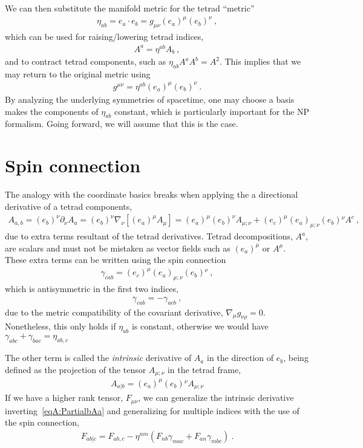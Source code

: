We can then substitute the manifold metric for the tetrad ``metric''
\begin{align}
    \eta_{ab} = e_a \cdot e_b = g_{\mu\nu} (e_a)^\mu (e_b)^\nu ~,
\end{align}
which can be used for raising/lowering tetrad indices,
\begin{align}
    A^a = \eta^{ab} A_b ~,
\end{align}
and to contract tetrad components, such as $\eta_{ab} A^a A^b = A^2$. This implies that we may return to the original metric using 
\begin{align}
    g^{\mu\nu} = \eta^{ab} (e_a)^\mu (e_b)^\nu ~.
\end{align}
By analyzing the underlying symmetries of spacetime, one may choose a basis makes the components of $\eta_{ab}$ constant, which is particularly important for the NP formalism.
Going forward, we will assume that this is the case.

\section{Spin connection}
\label{AppendixSpinConnection}

The analogy with the coordinate basics breaks when applying the a directional derivative of a tetrad components, 
\begin{align}
    A_{a,b} = (e_b)^\nu \partial_\nu A_{a} = (e_b)^\nu \nabla_\nu \left[ (e_a)^\mu A_\mu \right] = (e_a)^\mu (e_b)^\nu A_{\mu ; \nu} + (e_c)^\mu (e_a)_{\mu;\nu} (e_b){}^\nu A^c ~,
    \label{eqA:PartialbAa}
\end{align}
due to extra terms resultant of the tetrad derivatives. Tetrad decompositions, $A^a$, are scalars and must not be mistaken as vector fields such as $(e_a)^\mu$ or $A^\mu$. These extra terms can be written using the spin connection
\begin{align}
    \gamma_{cab} = (e_c)^\mu (e_a)_{\mu;\nu} (e_b){}^\nu ~,
\end{align}  
which is antisymmetric in the first two indices,
\begin{align}
    \gamma_{cab} = - \gamma_{acb} ~,
\end{align}
due to the metric compatibility of the covariant derivative, $\nabla_\mu g_{\nu\rho} = 0$.
Nonetheless, this only holds if $\eta_{ab}$ is constant, otherwise we would have $\gamma_{abc} + \gamma_{bac} = \eta_{ab,c}$

The other term is called the \emph{intrinsic} derivative of $A_a$ in the direction of $e_b$, being defined as the projection of the tensor $A_{\mu;\nu}$ in the tetrad frame,
\begin{align}
    A_{a\rvert  b} = (e_a)^\mu (e_b){}^\nu A_{\mu;\nu}
    \label{eqA:intrinsicDerA}
\end{align}
If we have a higher rank tensor, $F_{\mu\nu}$, we can generalize the intrinsic derivative inverting~\eqref{eqA:PartialbAa} and generalizing for multiple indices with the use of the spin connection,
\begin{align}
    F_{ab\rvert c} = F_{ab,c} - \eta^{nm} ( F_{nb} \gamma_{mac} + F_{an} \gamma_{mbc}) ~.
\end{align}


